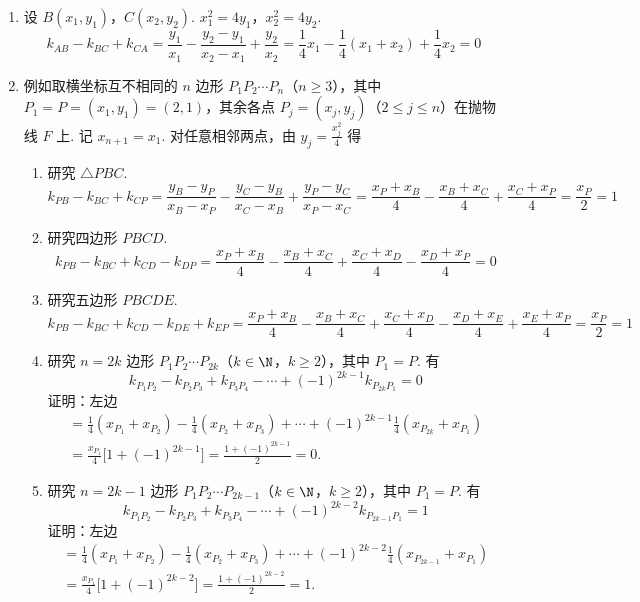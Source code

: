 \begin{solution}
\begin{enumerate}
\item 设 \(B(x_1,y_1)\)，\(C(x_2,y_2)\).
\(x_1^2=4y_1\)，\(x_2^2=4y_2\).
\[
k_{AB}-k_{BC}+k_{CA}
=\frac{y_1}{x_1}-\frac{y_2-y_1}{x_2-x_1}+\frac{y_2}{x_2}
=\frac{1}{4}x_1-\frac{1}{4}(x_1+x_2)+\frac{1}{4}x_2=0
\]

\item 例如取横坐标互不相同的 \(n\) 边形 \(P_1P_2\cdots P_n\)（\(n\ge3\)），其中 \(P_1=P=(x_1,y_1)=(2,1)\)，其余各点 \(P_j=(x_j,y_j)\)（\(2\le j\le n\)）在抛物线 \(F\) 上. 记 \(x_{n+1}=x_1\). 对任意相邻两点，由 \(y_j=\frac{x_j^2}{4}\) 得
\begin{enumerate}
\item 研究 \(\triangle PBC\).
\[
k_{PB}-k_{BC}+k_{CP}
=\frac{y_B-y_P}{x_B-x_P}-\frac{y_C-y_B}{x_C-x_B}+\frac{y_P-y_C}{x_P-x_C}
=\frac{x_P+x_B}{4}-\frac{x_B+x_C}{4}+\frac{x_C+x_P}{4}=\frac{x_P}{2}=1
\]

\item 研究四边形 \(PBCD\).
\[
k_{PB}-k_{BC}+k_{CD}-k_{DP}
=\frac{x_P+x_B}{4}-\frac{x_B+x_C}{4}+\frac{x_C+x_D}{4}-\frac{x_D+x_P}{4}=0
\]

\item 研究五边形 \(PBCDE\).
\[
k_{PB}-k_{BC}+k_{CD}-k_{DE}+k_{EP}
=\frac{x_P+x_B}{4}-\frac{x_B+x_C}{4}+\frac{x_C+x_D}{4}-\frac{x_D+x_E}{4}+\frac{x_E+x_P}{4}=\frac{x_P}{2}=1
\]

\item 研究 \(n=2k\) 边形 \(P_1P_2\cdots P_{2k}\)（\(k\in\N\)，\(k\ge2\)），其中 \(P_1=P\). 有
\[
k_{P_1P_2}-k_{P_2P_3}+k_{P_3P_4}-\cdots+(-1)^{2k-1}k_{P_{2k}P_1}=0
\]
证明：左边
\[
\begin{gathered}
=\frac{1}{4}(x_{P_1}+x_{P_2})-\frac{1}{4}(x_{P_2}+x_{P_3})+\cdots+(-1)^{2k-1}\frac{1}{4}(x_{P_{2k}}+x_{P_1}) \\
=\frac{x_{P_1}}{4}\bigl[1+(-1)^{2k-1}\bigr]=\frac{1+(-1)^{2k-1}}{2}=0.
\end{gathered}
\]

\item 研究 \(n=2k-1\) 边形 \(P_1P_2\cdots P_{2k-1}\)（\(k\in\N\)，\(k\ge2\)），其中 \(P_1=P\). 有
\[
k_{P_1P_2}-k_{P_2P_3}+k_{P_3P_4}-\cdots+(-1)^{2k-2}k_{P_{2k-1}P_1}=1
\]
证明：左边
\[
\begin{gathered}
=\frac{1}{4}(x_{P_1}+x_{P_2})-\frac{1}{4}(x_{P_2}+x_{P_3})+\cdots+(-1)^{2k-2}\frac{1}{4}(x_{P_{2k-1}}+x_{P_1}) \\
=\frac{x_{P_1}}{4}\bigl[1+(-1)^{2k-2}\bigr]=\frac{1+(-1)^{2k-2}}{2}=1.
\end{gathered}
\]


\end{enumerate}
\end{enumerate}
\end{solution}
